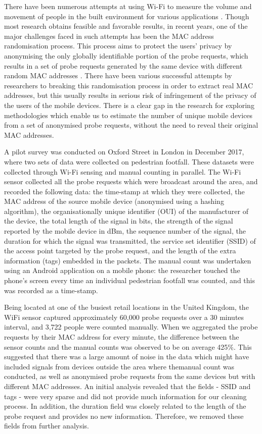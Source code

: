 \documentclass[11t, a4paper, twocolumn]{article}
\begin{document}
	There have been numerous attempts at using Wi-Fi to measure the volume and movement of people in the built environment for various applications \citep{zarim2006,sap2015,reki2007}. Though most research obtains feasible and favorable results, in recent years, one of the major challenges faced in such attempts has been the MAC address randomisation process. This process aims to protect the users’ privacy by anonymising the only globally identifiable portion of the probe requests, which results in a set of probe requests generated by the same device with different random MAC addresses \citep{green2008}. There have been various successful attempts by researchers to breaking this randomisation process in order to extract real MAC addresses, \citep{martin2017} but this usually results in serious risk of infringement of the privacy of the users of the mobile devices. There is a clear gap in the research for exploring methodologies which enable us to estimate the number of unique mobile devices from a set of anonymised probe requests, without the need to reveal their original MAC addresses.

	A pilot survey was conducted on Oxford Street in London in December 2017, where two sets of data were collected on pedestrian footfall. These datasets were collected through Wi-Fi sensing and manual counting in parallel. The Wi-Fi sensor collected all the probe requests which were broadcast around the area, and recorded the following data: the time-stamp at which they were collected, the MAC address of the source mobile device (anonymised using a hashing algorithm), the organisationally unique identifier (OUI) of the manufacturer of the device, the total length of the signal in bits, the strength of the signal reported by the mobile device in dBm, the sequence number of the signal, the duration for which the signal was transmitted, the service set identifier (SSID) of the access point targeted by the probe request, and the length of the extra information (tags) embedded in the packets. The manual count was undertaken using an Android application on a mobile phone: the researcher touched the phone’s screen every time an individual pedestrian footfall was counted, and this was recorded as a time-stamp. 

	Being located at one of the busiest retail locations in the United Kingdom, the WiFi sensor captured approximately 60,000 probe requests over a 30 minutes interval, and 3,722 people were counted manually. When we aggregated the probe requests by their MAC address for every minute, the difference between the sensor counts and the manual counts was observed to be on average 425\%. This suggested that there was a large amount of noise in the data which might have included signals from devices outside the area where themanual count was conducted, as well as anonymised probe requests from the same devices but with different MAC addresses. An initial analysis revealed that the fields - SSID and tags - were very sparse and did not provide much information for our cleaning process. In addition, the duration field was closely related to the length of the probe request and provides no new information. Therefore, we removed these fields from further analysis.
\end{document}
